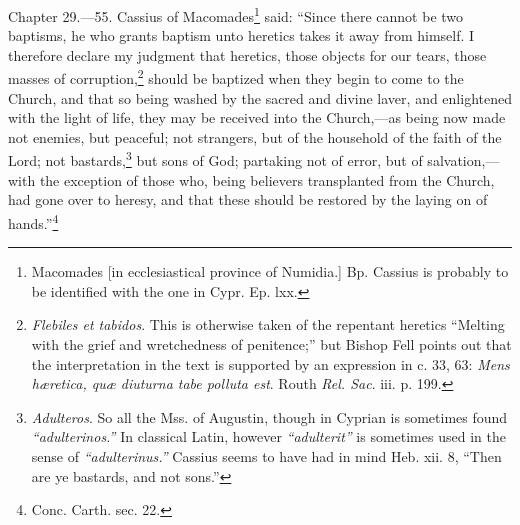 Chapter 29.—55. Cassius of Macomades\footnote{\par  Macomades [in ecclesiastical province of Numidia.] Bp. Cassius is probably to be identified with the one in Cypr. Ep. lxx.} said: ``Since there cannot be two baptisms, he who grants baptism unto heretics takes it away from himself. I therefore declare my judgment that heretics, those objects for our tears, those masses of corruption,\footnote{\par  \emph{Flebiles et tabidos}. This is otherwise taken of the repentant heretics ``Melting with the grief and wretchedness of penitence;'' but Bishop Fell points out that the interpretation in the text is supported by an expression in c. 33, 63: \emph{Mens hæretica, quæ diuturna tabe polluta est}. Routh \emph{Rel. Sac}. iii. p. 199.} should be baptized when they begin to come to the Church, and that so being washed by the sacred and divine laver, and enlightened with the light of life, they may be received into the Church,—as being now made not enemies, but peaceful; not strangers, but of the household of the faith of the Lord; not bastards,\footnote{\par  \emph{Adulteros}. So all the Mss. of Augustin, though in Cyprian is sometimes found \emph{``adulterinos.''} In classical Latin, however \emph{ ``adulterit''} is sometimes used in the sense of \emph{ ``adulterinus.''} Cassius seems to have had in mind Heb. xii. 8, ``Then are ye bastards, and not sons.''} but sons of God; partaking not of error, but of salvation,—with the exception of those who, being believers transplanted from the Church, had gone over to heresy, and that these should be restored by the laying on of hands.''\footnote{\par  Conc. Carth. sec. 22.}

